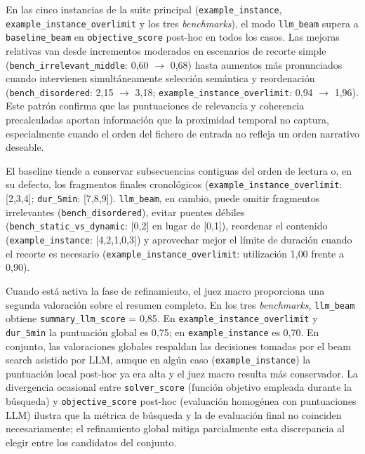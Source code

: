 \documentclass[12pt,a4paper]{article}
\begin{document}
En las cinco instancias de la suite principal (\texttt{example\_instance}, \linebreak \texttt{example\_instance\_overlimit} y los tres \textit{benchmarks}), el modo \texttt{llm\_beam} supera a \texttt{baseline\_beam} en \texttt{objective\_score} post-hoc en todos los casos. Las mejoras relativas van desde incrementos moderados en escenarios de recorte simple \linebreak (\texttt{bench\_irrelevant\_middle}: 0{,}60 $\rightarrow$ 0{,}68) hasta aumentos más pronunciados cuando intervienen simultáneamente selección semántica y reordenación \linebreak (\texttt{bench\_disordered}: 2{,}15 $\rightarrow$ 3{,}18; \texttt{example\_instance\_overlimit}: 0{,}94 $\rightarrow$ 1{,}96). Este patrón confirma que las puntuaciones de relevancia y coherencia precalculadas aportan información que la proximidad temporal no captura, especialmente cuando el orden del fichero de entrada no refleja un orden narrativo deseable.

El baseline tiende a conservar subsecuencias contiguas del orden de lectura o, en su defecto, los fragmentos finales cronológicos (\texttt{example\_instance\_overlimit}: [2,3,4]; \texttt{dur\_5min}: [7,8,9]). \texttt{llm\_beam}, en cambio, puede omitir fragmentos irrelevantes (\texttt{bench\_disordered}), evitar puentes débiles (\texttt{bench\_static\_vs\_dynamic}: [0,2] en lugar de [0,1]), reordenar el contenido (\texttt{example\_instance}: [4,2,1,0,3]) y aprovechar mejor el límite de duración cuando el recorte es necesario \linebreak (\texttt{example\_instance\_overlimit}: utilización 1{,}00 frente a 0{,}90).

Cuando está activa la fase de refinamiento, el juez macro proporciona una segunda valoración sobre el resumen completo. En los tres \textit{benchmarks}, \texttt{llm\_beam} obtiene \texttt{summary\_llm\_score} = 0{,}85. En \texttt{example\_instance\_overlimit} y \texttt{dur\_5min} la puntuación global es 0{,}75; en \texttt{example\_instance} es 0{,}70. En conjunto, las valoraciones globales respaldan las decisiones tomadas por el beam search asistido por LLM, aunque en algún caso (\texttt{example\_instance}) la puntuación local post-hoc ya era alta y el juez macro resulta más conservador. La divergencia ocasional entre \texttt{solver\_score} (función objetivo empleada durante la búsqueda) y \texttt{objective\_score} post-hoc (evaluación homogénea con puntuaciones LLM) ilustra que la métrica de búsqueda y la de evaluación final no coinciden necesariamente; el refinamiento global mitiga parcialmente esta discrepancia al elegir entre los candidatos del conjunto.
\end{document}
